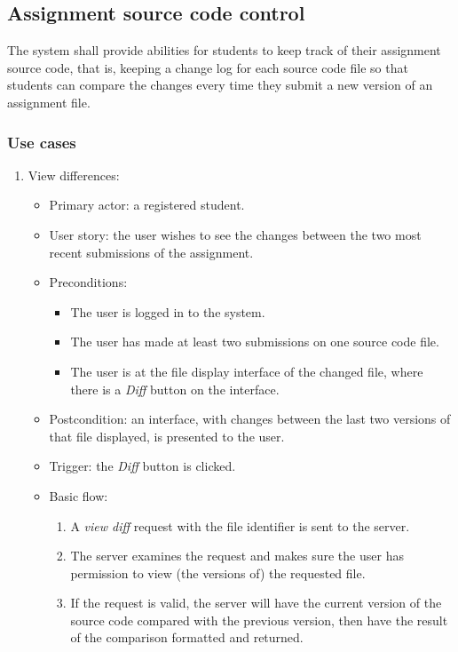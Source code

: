 \subsection{Assignment source code control}
The system shall provide abilities for students to keep track of their
assignment source code, that is, keeping a change log for each source code
file so that students can compare the changes every time they submit a new
version of an assignment file.

\subsubsection{Use cases}
\begin{enumerate}
\item View differences:
\begin{itemize}
    \item Primary actor: a registered student.
    \item User story: the user wishes to see the changes between the two most recent
        submissions of the assignment.
    \item Preconditions:
        \begin{itemize}
            \item The user is logged in to the system.
            \item The user has made at least two submissions on one source code
                file.
            \item The user is at the file display interface of the changed file,
                where there is a \emph{Diff} button on the interface.
        \end{itemize}
    \item Postcondition:
        an interface, with changes between the last two versions of that file
        displayed, is presented to the user.
    \item Trigger: the \emph{Diff} button is clicked.
    \item Basic flow:
        \begin{enumerate}
            \item A \emph{view diff} request with the file identifier is sent
                to the server.
            \item The server examines the request and makes sure the user has
                permission to view (the versions of) the requested file.
            \item If the request is valid, the server will have the current
                version of the source code compared with the previous version,
                then have the result of the comparison formatted and
                returned.
        \end{enumerate}
\end{itemize}
\end{enumerate}

